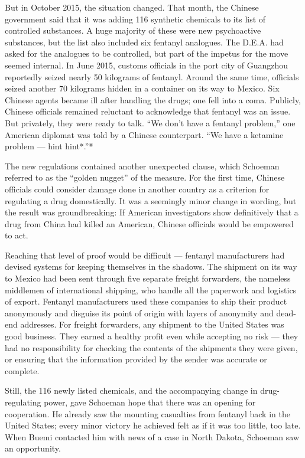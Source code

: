 But in October 2015, the situation changed. That month, the Chinese
government said that it was adding 116 synthetic chemicals to its list
of controlled substances. A huge majority of these were new psychoactive
substances, but the list also included six fentanyl analogues. The
D.E.A. had asked for the analogues to be controlled, but part of the
impetus for the move seemed internal. In June 2015, customs officials in
the port city of Guangzhou reportedly seized nearly 50 kilograms of
fentanyl. Around the same time, officials seized another 70 kilograms
hidden in a container on its way to Mexico. Six Chinese agents became
ill after handling the drugs; one fell into a coma. Publicly, Chinese
officials remained reluctant to acknowledge that fentanyl was an issue.
But privately, they were ready to talk. ``We don't have a fentanyl
problem,'' one American diplomat was told by a Chinese counterpart. ``We
have a ketamine problem --- hint hint*.''*

The new regulations contained another unexpected clause, which Schoeman
referred to as the ``golden nugget'' of the measure. For the first time,
Chinese officials could consider damage done in another country as a
criterion for regulating a drug domestically. It was a seemingly minor
change in wording, but the result was groundbreaking: If American
investigators show definitively that a drug from China had killed an
American, Chinese officials would be empowered to act.

Reaching that level of proof would be difficult --- fentanyl
manufacturers had devised systems for keeping themselves in the shadows.
The shipment on its way to Mexico had been sent through five separate
freight forwarders, the nameless middlemen of international shipping,
who handle all the paperwork and logistics of export. Fentanyl
manufacturers used these companies to ship their product anonymously and
disguise its point of origin with layers of anonymity and dead-end
addresses. For freight forwarders, any shipment to the United States was
good business. They earned a healthy profit even while accepting no risk
--- they had no responsibility for checking the contents of the
shipments they were given, or ensuring that the information provided by
the sender was accurate or complete.

Still, the 116 newly listed chemicals, and the accompanying change in
drug-regulating power, gave Schoeman hope that there was an opening for
cooperation. He already saw the mounting casualties from fentanyl back
in the United States; every minor victory he achieved felt as if it was
too little, too late. When Buemi contacted him with news of a case in
North Dakota, Schoeman saw an opportunity.

